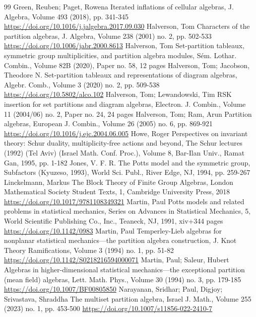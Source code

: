 \begin{thebibliography}{99}
 Green, Reuben; Paget, Rowena Iterated inflations of cellular algebras, J. Algebra, Volume 493 (2018), pp. 341-345 \url{https://doi.org/10.1016/j.jalgebra.2017.09.030}
 Halverson, Tom Characters of the partition algebras, J. Algebra, Volume 238 (2001) no. 2, pp. 502-533 \url{https://doi.org/10.1006/jabr.2000.8613}
 Halverson, Tom Set-partition tableaux, symmetric group multiplicities, and partition algebra modules, Sém. Lothar. Combin., Volume 82B (2020), Paper no. 58, 12 pages
 Halverson, Tom; Jacobson, Theodore N. Set-partition tableaux and representations of diagram algebras, Algebr. Comb., Volume 3 (2020) no. 2, pp. 509-538 \url{https://doi.org/10.5802/alco.102}
 Halverson, Tom; Lewandowski, Tim RSK insertion for set partitions and diagram algebras, Electron. J. Combin., Volume 11 (2004/06) no. 2, Paper no. 24, 24 pages
 Halverson, Tom; Ram, Arun Partition algebras, European J. Combin., Volume 26 (2005) no. 6, pp. 869-921 \url{https://doi.org/10.1016/j.ejc.2004.06.005}
 Howe, Roger Perspectives on invariant theory: Schur duality, multiplicity-free actions and beyond, The Schur lectures (1992) (Tel Aviv) (Israel Math. Conf. Proc.), Volume 8, Bar-Ilan Univ., Ramat Gan, 1995, pp. 1-182
 Jones, V. F. R. The Potts model and the symmetric group, Subfactors (Kyuzeso, 1993), World Sci. Publ., River Edge, NJ, 1994, pp. 259-267
 Linckelmann, Markus The Block Theory of Finite Group Algebras, London Mathematical Society Student Texts, 1, Cambridge University Press, 2018 \url{https://doi.org/10.1017/9781108349321}
 Martin, Paul Potts models and related problems in statistical mechanics, Series on Advances in Statistical Mechanics, 5, World Scientific Publishing Co., Inc., Teaneck, NJ, 1991, xiv+344 pages \url{https://doi.org/10.1142/0983}
 Martin, Paul Temperley-Lieb algebras for nonplanar statistical mechanics—the partition algebra construction, J. Knot Theory Ramifications, Volume 3 (1994) no. 1, pp. 51-82 \url{https://doi.org/10.1142/S0218216594000071}
 Martin, Paul; Saleur, Hubert Algebras in higher-dimensional statistical mechanics—the exceptional partition (mean field) algebras, Lett. Math. Phys., Volume 30 (1994) no. 3, pp. 179-185 \url{https://doi.org/10.1007/BF00805850}
 Narayanan, Sridhar; Paul, Digjoy; Srivastava, Shraddha The multiset partition algebra, Israel J. Math., Volume 255 (2023) no. 1, pp. 453-500 \url{https://doi.org/10.1007/s11856-022-2410-7}

\end{thebibliography}

